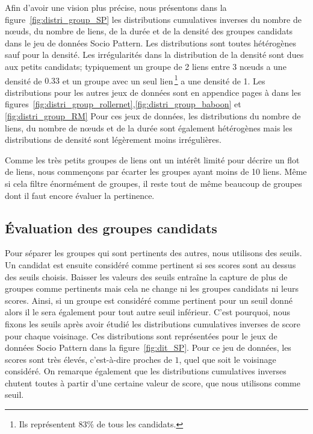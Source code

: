 Afin d'avoir une vision plus précise, nous présentons dans la figure~\ref{fig:distri_group_SP} les distributions cumulatives inverses du nombre de n\oe uds, du nombre de liens, de la durée et de la densité des groupes candidats dans le jeu de données Socio Pattern.
Les distributions sont toutes hétérogènes sauf pour la densité.
Les irrégularités dans la distribution de la densité sont dues aux petits candidats; typiquement un groupe de 2 liens entre 3 n\oe uds a une densité de $0.33$ et un groupe avec un seul lien\,\footnote{Ils représentent $83\%$ de tous les candidats.} a une densité de 1.
Les distributions pour les autres jeux de données sont en appendice pages \pageref{fig:distri_group_rollernet} à \pageref{fig:distri_group_RM} dans les figures~\ref{fig:distri_group_rollernet},\ref{fig:distri_group_baboon} et \ref{fig:distri_group_RM}
Pour ces jeux de données, les distributions du nombre de liens, du nombre de n\oe uds et de la durée sont également hétérogènes mais les distributions de densité sont légèrement moins irrégulières.


Comme les très petits groupes de liens ont un intérêt limité pour décrire un flot de liens, nous commençons par écarter les groupes ayant moins de 10 liens.
Même si cela filtre énormément de groupes, il reste tout de même beaucoup de groupes dont il faut encore évaluer la pertinence.




\subsection{Évaluation des groupes candidats}

Pour séparer les groupes qui sont pertinents des autres, nous utilisons des seuils.
Un candidat est ensuite considéré comme pertinent si ses scores sont au dessus des seuils choisis.
Baisser les valeurs des seuils entraîne la capture de plus de groupes comme pertinents mais cela ne change ni les groupes candidats ni leurs scores.
Ainsi, si un groupe est considéré comme pertinent pour un seuil donné alors il le sera également pour tout autre seuil inférieur.
C'est pourquoi, nous fixons les seuils après avoir étudié les distributions cumulatives inverses de score pour chaque voisinage.
Ces distributions sont représentées pour le jeux de données Socio Pattern dans la figure~\ref{fig:dit_SP}.
Pour ce jeu de données, les scores sont très élevés, c'est-à-dire proches de $1$, quel que soit le voisinage considéré.
On remarque également que les distributions cumulatives inverses chutent toutes à partir d'une certaine valeur de score, que nous utilisons comme seuil.

